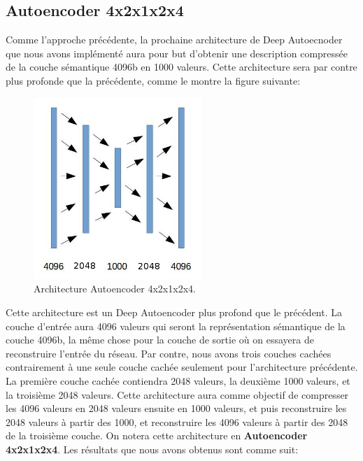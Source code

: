 

\subsection{Autoencoder 4x2x1x2x4} 

	Comme l'approche précédente, la prochaine architecture de Deep Autoecnoder que nous avons implémenté aura pour but d'obtenir une description compressée de la couche sémantique 4096b en 1000 valeurs. Cette architecture sera par contre plus profonde que la précédente, comme le montre la figure suivante:

\begin{figure}[H]
	\centering
		\includegraphics[width=2.5in]{Figures/ae/42124.jpg}
	\caption[An Electron]{Architecture Autoencoder 4x2x1x2x4.}
	\label{fig:Electron}
\end{figure}

	Cette architecture est un Deep Autoencoder plus profond que le précédent. La couche d'entrée aura 4096 valeurs qui seront la représentation sémantique de la couche 4096b, la même chose pour la couche de sortie où on essayera de reconstruire l'entrée du réseau. Par contre, nous avons trois couches cachées contrairement à une seule couche cachée seulement pour l'architecture précédente. La première couche cachée contiendra 2048 valeurs, la deuxième 1000 valeurs, et la troisième 2048 valeurs. Cette architecture aura comme objectif de compresser les 4096 valeurs en 2048 valeurs ensuite en 1000 valeurs, et puis reconstruire les 2048 valeurs à partir des 1000, et reconstruire les 4096 valeurs à partir des 2048 de la troisième couche. On notera cette architecture en \textbf{Autoencoder 4x2x1x2x4}. Les résultats que nous avons obtenus sont comme suit:

